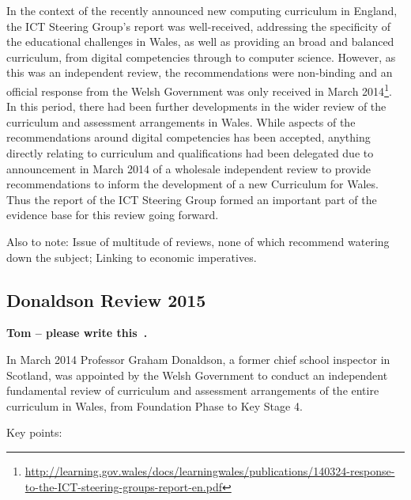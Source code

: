\documentclass{sig-alternate}
\begin{document}
In the context of the recently announced new computing curriculum in
England, the ICT Steering Group's report was well-received, addressing
the specificity of the educational challenges in Wales, as well as
providing an broad and balanced curriculum, from digital competencies
through to computer science. However, as this was an independent
review, the recommendations were non-binding and an official response
from the Welsh Government was only received in March
2014\footnote{\url{http://learning.gov.wales/docs/learningwales/publications/140324-response-to-the-ICT-steering-groups-report-en.pdf}}. In
this period, there had been further developments in the wider review
of the curriculum and assessment arrangements in Wales. While aspects
of the recommendations around digital competencies has been accepted,
anything directly relating to curriculum and qualifications had been
delegated due to announcement in March 2014 of a wholesale independent
review to provide recommendations to inform the development of a new
Curriculum for Wales. Thus the report of the ICT Steering Group formed
an important part of the evidence base for this review going forward.

Also to note: Issue of multitude of reviews, none of which recommend watering down
the subject; Linking to economic imperatives.

\subsection{Donaldson Review 2015}

\textbf{Tom -- please write this~\cite{Donaldson:2015}.}

In March 2014 Professor Graham Donaldson, a former chief school
inspector in Scotland, was appointed by the Welsh Government to
conduct an independent fundamental review of curriculum and assessment
arrangements of the entire curriculum in Wales, from Foundation Phase
to Key Stage 4.

Key points:
\end{document}
